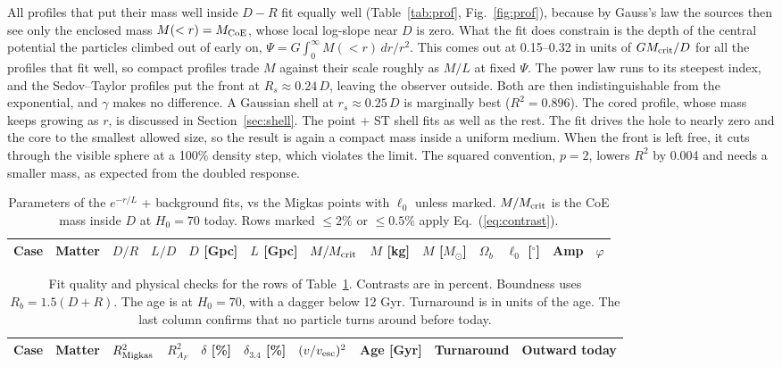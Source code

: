 \documentclass[10pt,letterpaper]{article}
\begin{document}
All profiles that put their mass well inside $D-R$ fit equally well (Table~\ref{tab:prof}, Fig.~\ref{fig:prof}), because by Gauss's law the sources then see only the enclosed mass $M(<r)=M_{\rm CoE}$, whose local log-slope near $D$ is zero. What the fit does constrain is the depth of the central potential the particles climbed out of early on, $\Psi=G\int_0^\infty M(<r)\,dr/r^2$. This comes out at 0.15--0.32 in units of $GM_{\rm crit}/D$ for all the profiles that fit well, so compact profiles trade $M$ against their scale roughly as $M/L$ at fixed $\Psi$. The power law runs to its steepest index, and the Sedov--Taylor profiles put the front at $R_s\approx0.24\,D$, leaving the observer outside. Both are then indistinguishable from the exponential, and $\gamma$ makes no difference. A Gaussian shell at $r_s\approx0.25\,D$ is marginally best ($R^2=0.896$). The cored profile, whose mass keeps growing as $r$, is discussed in Section~\ref{sec:shell}. The point + ST shell fits as well as the rest. The fit drives the hole to nearly zero and the core to the smallest allowed size, so the result is again a compact mass inside a uniform medium. When the front is left free, it cuts through the visible sphere at a 100\% density step, which violates the limit. The squared convention, $p=2$, lowers $R^2$ by 0.004 and needs a smaller mass, as expected from the doubled response.

\begin{table}[H]\centering\scriptsize\setlength{\tabcolsep}{2.4pt}
\caption{Parameters of the $e^{-r/L}$ + background fits, vs the Migkas points with $\ell_0$ unless marked. $M/M_{\rm crit}$ is the CoE mass inside $D$ at $H_0=70$ today. Rows marked $\le2\%$ or $\le0.5\%$ apply Eq.~(\ref{eq:contrast}).}\label{tab:par}
\begin{tabular}{llccccccccccc}\toprule
Case & Matter & $D/R$ & $L/D$ & $D$ [Gpc] & $L$ [Gpc] & $M/M_{\rm crit}$ & $M$ [kg] & $M$ [$M_\odot$] & $\Omega_b$ & $\ell_0$ [$^\circ$] & Amp & $\varphi$\\\midrule

\bottomrule\end{tabular}\end{table}

\begin{table}[H]\centering\scriptsize\setlength{\tabcolsep}{3pt}
\caption{Fit quality and physical checks for the rows of Table~\ref{tab:par}. Contrasts are in percent. Boundness uses $R_b=1.5(D+R)$. The age is at $H_0=70$, with a dagger below 12 Gyr. Turnaround is in units of the age. The last column confirms that no particle turns around before today.}\label{tab:diag}
\begin{tabular}{llcccccccc}\toprule
Case & Matter & $R^2_{\rm Migkas}$ & $R^2_{A_F}$ & $\delta$ [\%] & $\delta_{3.4}$ [\%] & $(v/v_{\rm esc})^2$ & Age [Gyr] & Turnaround & Outward today\\\midrule

\bottomrule\end{tabular}\end{table}
\end{document}
